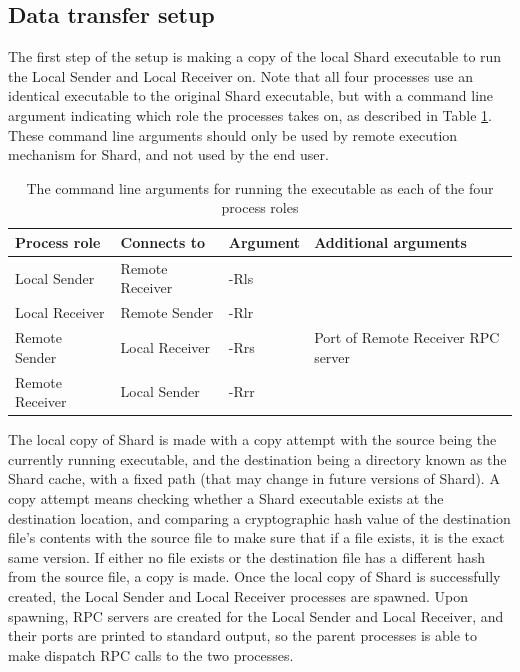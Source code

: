 \documentclass[twoside]{report}
\begin{document}
\subsection{Data transfer setup}

The first step of the setup is making a copy of the local Shard executable to run the Local Sender and Local Receiver on.
Note that all four processes use an identical executable to the original Shard executable, but with a command line argument indicating which role the processes takes on, as described in Table \ref{fig:process_role_args}.
These command line arguments should only be used by remote execution mechanism for Shard, and not used by the end user.

\begin{table}[h]
  \begin{center}
    \begin{tabular}{|l|l|l|l|}
      \hline
      Process role    & Connects to     & Argument & Additional arguments               \\ \hline
      Local Sender    & Remote Receiver & -Rls     &                                    \\ \hline
      Local Receiver  & Remote Sender   & -Rlr     &                                    \\ \hline
      Remote Sender   & Local Receiver  & -Rrs     & Port of Remote Receiver RPC server \\ \hline
      Remote Receiver & Local Sender    & -Rrr     &                                    \\ \hline
    \end{tabular}
    \caption{The command line arguments for running the executable as each of the four process roles}
    \label{fig:process_role_args}
  \end{center}
\end{table}


The local copy of Shard is made with a copy attempt with the source being the currently running executable, and the destination being a directory known as the Shard cache, with a fixed path (that may change in future versions of Shard).
A copy attempt means checking whether a Shard executable exists at the destination location, and comparing a cryptographic hash value of the destination file's contents with the source file to make sure that if a file exists, it is the exact same version.
If either no file exists or the destination file has a different hash from the source file, a copy is made.
Once the local copy of Shard is successfully created, the Local Sender and Local Receiver processes are spawned.
Upon spawning, RPC servers are created for the Local Sender and Local Receiver, and their ports are printed to standard output, so the parent processes is able to make dispatch RPC calls to the two processes.
\end{document}
